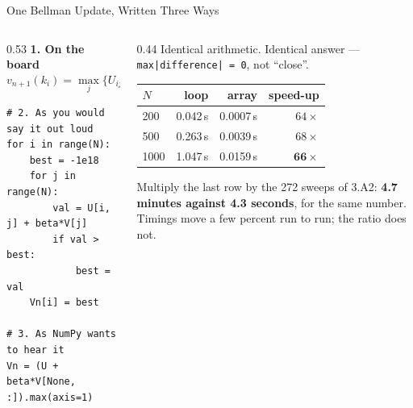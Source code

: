 \begin{frame}[fragile]{One Bellman Update, Written Three Ways}
\begin{columns}[T]
\begin{column}{0.53\textwidth}
\footnotesize
\textbf{1. On the board}
\[
  v_{n+1}(k_i)=\max_{j}\big\{U_{ij}+\beta v_n(k_j)\big\}
\]
\vspace{-3mm}
\begin{lstlisting}
# 2. As you would say it out loud
for i in range(N):
    best = -1e18
    for j in range(N):
        val = U[i, j] + beta*V[j]
        if val > best:
            best = val
    Vn[i] = best

# 3. As NumPy wants to hear it
Vn = (U + beta*V[None, :]).max(axis=1)
\end{lstlisting}
\end{column}
\begin{column}{0.44\textwidth}
\small
Identical arithmetic. Identical answer --- \texttt{max|difference| = 0}, not ``close''.
\medskip
\begin{center}\footnotesize
\begin{tabular}{@{}lrrr@{}}
\toprule
$N$ & loop & array & speed-up \\
\midrule
200 & 0.042\,s & 0.0007\,s & $64\times$ \\
500 & 0.263\,s & 0.0039\,s & $68\times$ \\
1000 & 1.047\,s & 0.0159\,s & $\mathbf{66\times}$ \\
\bottomrule
\end{tabular}
\end{center}
\vspace{1mm}
\begin{conceptbox}\footnotesize
Multiply the last row by the 272 sweeps of 3.A2: \textbf{4.7 minutes against 4.3 seconds}, for the same number.\\[1mm]
{\scriptsize Timings move a few percent run to run; the ratio does not.}
\end{conceptbox}
\end{column}
\end{columns}
\end{frame}

